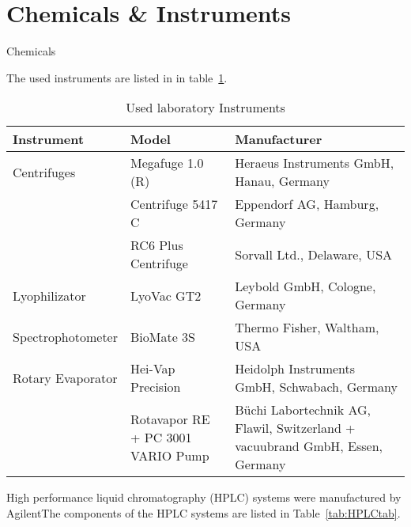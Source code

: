 \section{Chemicals \& Instruments} %
\label{sec:chemicals_&_instruments}

Chemicals

The used instruments are listed in in table~\ref{tab:labins}.

\begin{table}[H]
	\caption{Used laboratory Instruments}
	\label{tab:labins}
	\centering
	\begin{tabularx}{\textwidth}{XXX}
		\toprule
		\textbf{Instrument}			& \textbf{Model}		& \textbf{Manufacturer}	\\
		\midrule
		Centrifuges			&	Megafuge 1.0 (R)		&	Heraeus Instruments GmbH, Hanau, Germany	\\
							&	Centrifuge 5417 C 		&	Eppendorf AG, Hamburg, Germany				\\
							&	RC6 Plus Centrifuge 	&	Sorvall Ltd., Delaware, USA					\\
		Lyophilizator		&	LyoVac GT2				&	Leybold GmbH, Cologne, Germany				\\
		Spectrophotometer	&	BioMate 3S				&	Thermo Fisher, Waltham, USA					\\
		Rotary Evaporator	&	Hei-Vap Precision		&	Heidolph Instruments GmbH, Schwabach, Germany	\\
							&	Rotavapor RE + PC 3001 VARIO Pump	&	Büchi Labortechnik AG, Flawil, Switzerland + vacuubrand GmbH, Essen, Germany \\

		\bottomrule
	\end{tabularx}
\end{table}

High performance liquid chromatography (HPLC) systems were manufactured by AgilentThe components of the HPLC systems are listed in Table~\ref{tab:HPLCtab}.

